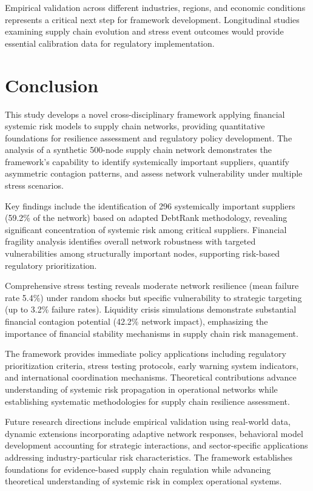 \documentclass[a4 paper, 11pt,twoside]{article}
\newcommand{\0}{\Bf{0}}
\theoremstyle{definition}
\begin{document}
Empirical validation across different industries, regions, and economic conditions represents a critical next step for framework development. Longitudinal studies examining supply chain evolution and stress event outcomes would provide essential calibration data for regulatory implementation.

\section{Conclusion}

This study develops a novel cross-disciplinary framework applying financial systemic risk models to supply chain networks, providing quantitative foundations for resilience assessment and regulatory policy development. The analysis of a synthetic 500-node supply chain network demonstrates the framework's capability to identify systemically important suppliers, quantify asymmetric contagion patterns, and assess network vulnerability under multiple stress scenarios.

Key findings include the identification of 296 systemically important suppliers (59.2\% of the network) based on adapted DebtRank methodology, revealing significant concentration of systemic risk among critical suppliers. Financial fragility analysis identifies overall network robustness with targeted vulnerabilities among structurally important nodes, supporting risk-based regulatory prioritization.

Comprehensive stress testing reveals moderate network resilience (mean failure rate 5.4\%) under random shocks but specific vulnerability to strategic targeting (up to 3.2\% failure rates). Liquidity crisis simulations demonstrate substantial financial contagion potential (42.2\% network impact), emphasizing the importance of financial stability mechanisms in supply chain risk management.

The framework provides immediate policy applications including regulatory prioritization criteria, stress testing protocols, early warning system indicators, and international coordination mechanisms. Theoretical contributions advance understanding of systemic risk propagation in operational networks while establishing systematic methodologies for supply chain resilience assessment.

Future research directions include empirical validation using real-world data, dynamic extensions incorporating adaptive network responses, behavioral model development accounting for strategic interactions, and sector-specific applications addressing industry-particular risk characteristics. The framework establishes foundations for evidence-based supply chain regulation while advancing theoretical understanding of systemic risk in complex operational systems.
\end{document}
